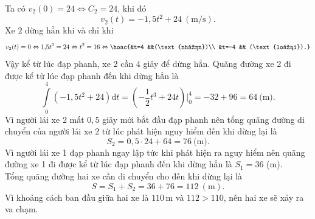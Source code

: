 \begin{ex}
{\begin{itemchoice}
			Ta có $v_2(0) = 24 \Leftrightarrow C_2 = 24$, khi đó
			\[v_2(t) = -1{,}5t^2 + 24\ (\text{m/s}).\]
			Xe $2$ dừng hẳn khi và chỉ khi
			\[ v_2(t) = 0 \Leftrightarrow 1{,}5t^2 = 24 \Leftrightarrow t^2 = 16 \Leftrightarrow \hoac{&t=4 &&(\text{nhận})\\ &t=-4 && (\text{loại}).} \]
			Vậy kể từ lúc đạp phanh, xe 2 cần $4$ giây để dừng hẳn.
			\itemch Quãng đường xe 2 đi được kể từ lúc đạp phanh đến khi dừng hẳn là
			\[\displaystyle \int\limits_0^4\left(-1{,}5t^2 + 24 \right)\mathrm{d}t =  \left(- \dfrac{1}{2}t^3 + 24t \right)\bigg|_0^4 = -32 + 96 = 64 \ \text{(m)}. \]
			Vì người lái xe 2 mất $0{,}5$ giây mới bắt đầu đạp phanh nên tổng quãng đường di chuyển của người lái xe 2 từ lúc phát hiện nguy hiểm đến khi dừng lại là
			\[S_2 = 0{,}5\cdot 24 + 64 = 76\ \text{(m)}.\]
			Vì người lái xe 1 đạp phanh ngay lập tức khi phát hiện ra nguy hiểm nên quãng đường xe 1 đi được kể từ lúc đạp phanh đến khi dừng hẳn là $S_1 = 36$ (m).\\
			Tổng quãng đường hai xe cần di chuyển cho đến khi dừng lại là
			\[S = S_1 + S_2 = 36 + 76 = 112\ (\text{m}).\]
			Vì khoảng cách ban đầu giữa hai xe là $110$\,m và $112>110$, nên hai xe sẽ xảy ra va chạm.
		\end{itemchoice}}
\end{ex}

